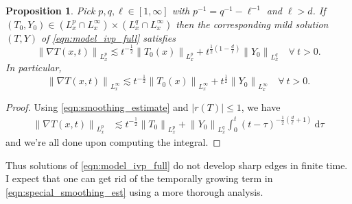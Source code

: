 \documentclass[twosided, 12pt]{article}
\numberwithin{equation}{section}
\theoremstyle{plain}
\newtheorem{prop}[thm]{Proposition}
\newcommand{\diff}{\mathrm{d}}
\begin{document}
\begin{prop}
Pick $p,q,\ell \in \left[1,\infty\right]$ with $p^{-1}=q^{-1}-\ell^{-1}$ and $\ell>d$. If $(T_0, Y_0)\in \left(L^{p}_{x}\cap L^{\infty}_{x}\right)\times \left(L^{q}_{x}\cap L^{\infty}_{x}\right)$ then the corresponding mild solution  $(T,Y)$ of \eqref{eqn:model_ivp_full} satisfies
    \begin{equation}\label{eqn:special_smoothing_est}
     \left\|\nabla T(x,t)\right\|_{L^p_{x}} \lesssim t^{-\frac12} \left\|T_0(x)\right\|_{L^p_x} + t^{\frac12\left(1-\frac{d}{\ell}\right)}\left\|Y_0\right\|_{L^q_x} \quad \forall \ t>0.
    \end{equation}
In particular, 
 \begin{equation}\label{eqn:linfty_smoothing_est}
     \left\|\nabla T(x,t)\right\|_{L^\infty_{x}} \lesssim t^{-\frac12} \left\|T_0(x)\right\|_{L^\infty_x} + t^{\frac12}\left\|Y_0\right\|_{L^\infty_x} \quad \forall \ t>0.
    \end{equation}
\end{prop}
\begin{proof}
 Using \eqref{eqn:smoothing_estimate} and $|r(T)|\leq 1$, we have 
    \begin{align*}
        \left\|\nabla T(x,t)\right\|_{L^{p}_{x}} %
        &\lesssim t^{-\frac{1}{2}}\left\|T_0\right\|_{L^p_{x}} + \left\|Y_0\right\|_{L^q_x}\int_0^t \left(t-\tau\right)^{-\frac{1}{2}\left(\frac{d}{\ell}+1\right)} \ \diff \tau
    \end{align*}
    and we're all done upon computing the integral. 
\end{proof}
\noindent Thus solutions of \eqref{eqn:model_ivp_full} do not develop sharp edges in finite time. I expect that one can get rid of the temporally growing term in \eqref{eqn:special_smoothing_est} using a more thorough analysis.
\end{document}
